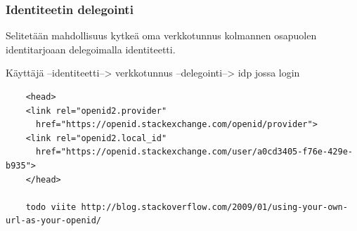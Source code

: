 \documentclass[finnish,gradu]{tktltiki}
\begin{document}


  \subsubsection{Identiteetin delegointi} %
  \label{ssub:identiteetin_delegointi}

  Selitetään mahdollisuus kytkeä oma verkkotunnus kolmannen osapuolen identitarjoaan delegoimalla identiteetti.

  Käyttäjä --identiteetti--> verkkotunnus --delegointi--> idp jossa login

  \begin{verbatim}
    <head>
    <link rel="openid2.provider"
      href="https://openid.stackexchange.com/openid/provider">
    <link rel="openid2.local_id"
      href="https://openid.stackexchange.com/user/a0cd3405-f76e-429e-b935">
    </head>

    todo viite http://blog.stackoverflow.com/2009/01/using-your-own-url-as-your-openid/
  \end{verbatim}
\end{document}
